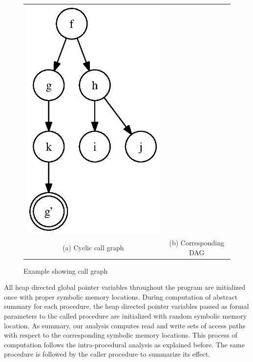 \begin{figure}
\begin{center}
{\begin{tabular}{ c c }
      \includegraphics[scale=0.75]{ordered_graph} \\
     (a) Cyclic call graph & 
     (b) Corresponding DAG \\
    \end{tabular}}
  \end{center}
  \caption{\label{fig:callgraph} Example showing call graph }
\end{figure}
  
All heap directed global  
pointer variables throughout the program are initialized once with proper 
symbolic memory locations. During computation of abstract summary for each  
procedure, the heap directed pointer variables passed as formal 
parameters to the called procedure are 
initialized with random symbolic memory location. As summary, 
our analysis computes read and write sets of access paths with respect 
to the corresponding symbolic memory locations. This process of computation 
follows the intra-procedural analysis as explained before. The same 
procedure is followed by the caller procedure to summarize its effect. 
%
